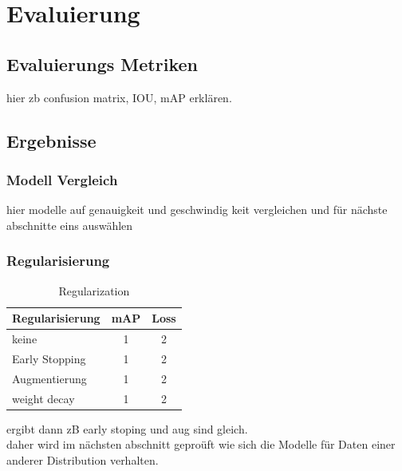 \chapter{Evaluierung}\label{kap:eval}

\section{Evaluierungs Metriken}\label{sec:metricen}

hier zb confusion matrix, IOU, mAP erklären.

\section{Ergebnisse}\label{sec:results}

\subsection{Modell Vergleich}

hier modelle auf genauigkeit und geschwindig keit vergleichen 
und für nächste abschnitte eins auswählen



\subsection{Regularisierung}\label{subsec:regularization}

\begin{table}[htb]
    \centering
    \label{tab:regularization}
    \begin{tabular}{| l || c | c |} 
        \hline
        Regularisierung & mAP & Loss\\
        \hline
        keine & 1 & 2 \\
        \hline
        Early Stopping & 1 & 2 \\
        \hline
        Augmentierung & 1 & 2 \\
        \hline
        weight decay & 1 & 2 \\
        \hline
    \end{tabular}        
    \caption{Regularization}
\end{table}


ergibt dann zB early stoping und aug sind gleich.
\\
daher wird im nächsten abschnitt geproüft wie sich 
die Modelle für Daten einer anderer Distribution verhalten.


